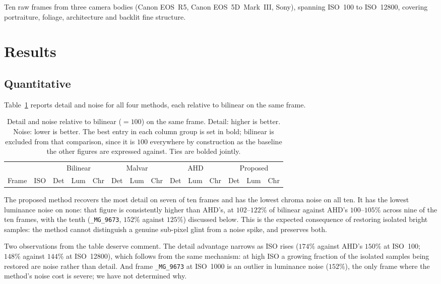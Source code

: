 \documentclass[10pt,a4paper]{article}
\begin{document}
Ten raw frames from three camera bodies (Canon EOS~R5, Canon EOS~5D~Mark~III,
Sony), spanning ISO~100 to ISO~12800, covering portraiture, foliage,
architecture and backlit fine structure.

\section{Results}
\label{sec:results}

\subsection{Quantitative}

Table~\ref{tab:main} reports detail and noise for all four methods, each
relative to bilinear on the same frame.

\begin{table}[htbp]
\centering
\small
\caption{Detail and noise relative to bilinear ($=100$) on the same frame.
Detail: higher is better. Noise: lower is better. The best entry in each
column group is set in bold; bilinear is excluded from that comparison, since
it is $100$ everywhere by construction as the baseline the other figures are
expressed against. Ties are bolded jointly.}
\label{tab:main}
\begin{tabular}{lr rrr rrr rrr rrr}
\toprule
& & \multicolumn{3}{c}{Bilinear} & \multicolumn{3}{c}{Malvar}
  & \multicolumn{3}{c}{AHD} & \multicolumn{3}{c}{Proposed} \\
\cmidrule(lr){3-5}\cmidrule(lr){6-8}\cmidrule(lr){9-11}\cmidrule(lr){12-14}
Frame & ISO & Det & Lum & Chr & Det & Lum & Chr & Det & Lum & Chr
      & Det & Lum & Chr \\
\midrule

\bottomrule
\end{tabular}
\end{table}

The proposed method recovers the most detail on seven of ten frames and has the
lowest chroma noise on all ten. It has the lowest luminance noise on none: that
figure is consistently higher than AHD's, at $102$--$122\%$ of bilinear against
AHD's $100$--$105\%$ across nine of the ten frames, with the tenth
(\verb|_MG_9673|, $152\%$ against $125\%$) discussed below. This is the
expected consequence of restoring isolated bright samples: the method cannot
distinguish a genuine sub-pixel glint from a noise spike, and preserves both.

Two observations from the table deserve comment. The detail advantage narrows
as ISO rises ($174\%$ against AHD's $150\%$ at ISO~100; $148\%$ against $144\%$
at ISO~12800), which follows from the same mechanism: at high ISO a growing
fraction of the isolated samples being restored are noise rather than detail.
And frame \verb|_MG_9673| at ISO~1000 is an outlier in luminance noise
($152\%$), the only frame where the method's noise cost is severe; we have not
determined why.
\end{document}
